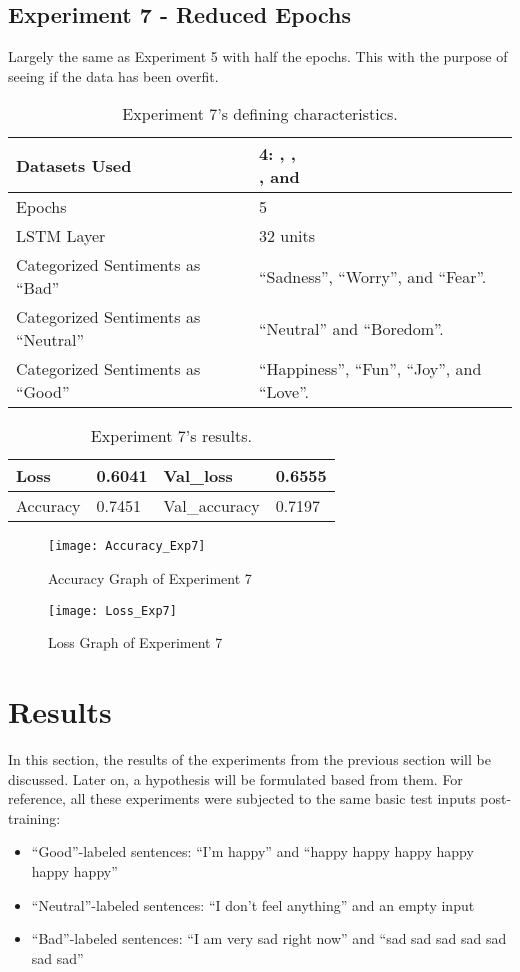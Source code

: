 \subsection{Experiment 7 - Reduced Epochs}
\label{exp7}
Largely the same as Experiment 5 with half the epochs. This with the purpose of seeing if the data has been overfit.
\begin{table}[!h]
	\caption{Experiment 7's defining characteristics.}
	\vspace{0.5cm}
	\centering
	\begin{tabular}[t]{|l|l|}
	\hline
		Datasets Used & \makecell{4: \citet{d1}, \citet{d2},\\ \citet{d3}, and \citet{d4}}
	\\ \hline
		Epochs & 5
	\\ \hline
		LSTM Layer & 32 units
	\\ \hline
		Categorized Sentiments as ``Bad'' & ``Sadness'', ``Worry'', and ``Fear''.
	\\ \hline	
		 Categorized Sentiments as ``Neutral'' & ``Neutral'' and ``Boredom''.
	\\ \hline	
		Categorized Sentiments as ``Good'' & ``Happiness'', ``Fun'', ``Joy'', and ``Love''.
	\\ \hline
	\end{tabular}
\end{table}

\begin{table}[!b]
	\caption{Experiment 7's results.}
	\vspace{0.5cm}
	\centering
	\begin{tabular}[t]{|l|l|l|l|}
	\hline
		Loss & 0.6041 & Val\_loss & 0.6555
	\\ \hline
		Accuracy & 0.7451 & Val\_accuracy & 0.7197
	\\ \hline
	\end{tabular}
\end{table}


\begin{figure}[!h]
	\centering
	\texttt{[image: Accuracy\_Exp7]}
	\caption{Accuracy Graph of Experiment 7}
	\label{fig:accuracy_exp7}
	\texttt{[image: Loss\_Exp7]}
	\caption{Loss Graph of Experiment 7}
	\label{fig:loss_exp7}
\end{figure}
\pagebreak

\section{Results}
In this section, the results of the experiments from the previous section will be discussed. Later on, a hypothesis will be formulated based from them. For reference, all these experiments were subjected to the same basic test inputs post-training:
\begin{itemize}
	\item ``Good''-labeled sentences: ``I'm happy'' and ``happy happy happy happy happy happy''
	\item ``Neutral''-labeled sentences: ``I don't feel anything'' and an empty input
	\item ``Bad''-labeled sentences: ``I am very sad right now'' and ``sad sad sad sad sad sad sad''
\end{itemize}
